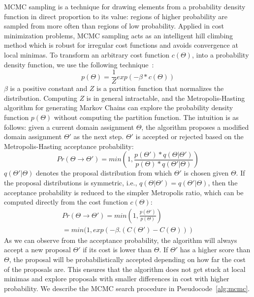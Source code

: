 MCMC sampling is a technique for drawing elements from a
probability density function in direct proportion to its value: 
regions of higher probability are sampled from more often than 
regions of low probability.
Applied in cost minimization problems,
MCMC sampling acts as an intelligent hill climbing method which
is robust for irregular cost functions and avoids convergence at 
local minimas. To transform an arbitrary cost function $c(\Theta)$, 
into a probability density function, we use the following 
technique~\cite{mcmcbook}:
\begin{equation}
	p(\Theta) = \frac{1}{Z}exp(-\beta * c(\Theta))
\end{equation}
$\beta$ is a positive constant and $Z$ is a partition function that
normalizes the distribution. Computing $Z$ is in general 
intractable, and the Metropolis-Hasting algorithm for 
generating Markov Chains can explore the probability density
function $p(\Theta)$ without computing the partition function. 
The intuition is as follows: given a current domain
assignment $\Theta$, the algorithm proposes a modified 
domain assignment $\Theta'$ as the next step. $\Theta'$
is accepted or rejected based on the Metropolis-Hasting
acceptance probability: 
\begin{equation}
Pr(\Theta \rightarrow \Theta') = min(1, \frac{p(\Theta')*q(\Theta| \Theta')}{p(\Theta)*q(\Theta'| \Theta)})
\end{equation}
$q(\Theta'| \Theta)$ denotes the proposal distribution from 
which $\Theta'$ is chosen given $\Theta$. If the proposal 
distributions is symmetric, i.e., 
$q(\Theta| \Theta') = q(\Theta'| \Theta)$, then the acceptance
probability is reduced to the simpler Metropolis ratio, which
can be computed directly from the cost function $c(\Theta)$:
\begin{multline}
Pr(\Theta \rightarrow \Theta') = min(1, \frac{p(\Theta')}{p(\Theta)}) \\
= min(1, exp(-\beta.(C(\Theta') - C(\Theta)))
\end{multline}
As we can observe from the acceptance probability, 
the algorithm will always accept a new proposal $\Theta'$
if its cost is lower than $\Theta$. If $\Theta'$ has a 
higher score than $\Theta$, the proposal will be 
probabilistically accepted depending on 
how far the cost of the proposals are. This ensures that 
the algorithm does not get stuck at local minimas and 
explore proposals with smaller differences in cost with 
higher probability. We describe the MCMC search procedure 
in Pseudocode~\cref{alg:mcmc}. 

